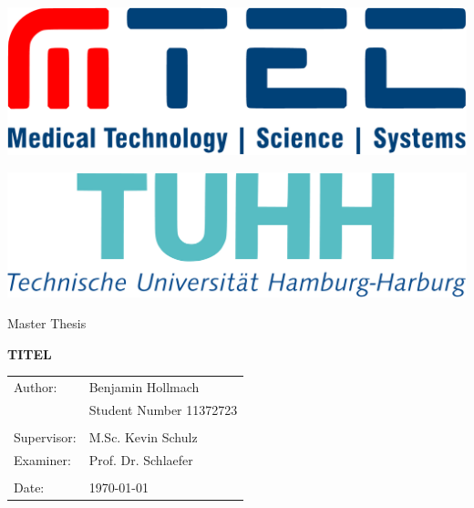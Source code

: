 
\thispagestyle{empty}       %
	

\begin{center}

\sffamily
	\begin{minipage}[hbt]{3cm}
		\centering
		\includegraphics[scale=0.15]{Bilder/LogoMTEC}\\
	\end{minipage}
	\hfill
	\begin{minipage}[hbt]{7cm}
		\centering
		\includegraphics[scale=0.1]{Bilder/LogoTUHH}\\
	\end{minipage}
 
\vspace{30mm} 

\huge Master Thesis

\vspace{30mm}


\LARGE \textbf{TITEL}

\vfill

\end{center}
\rmfamily
\begin{tabular}{ll}
Author: & Benjamin Hollmach\\
& Student Number 11372723\\
\\
Supervisor: & M.Sc. Kevin Schulz\\
Examiner: & Prof. Dr. Schlaefer
\\
\\
Date: & \today\\
\end{tabular}



